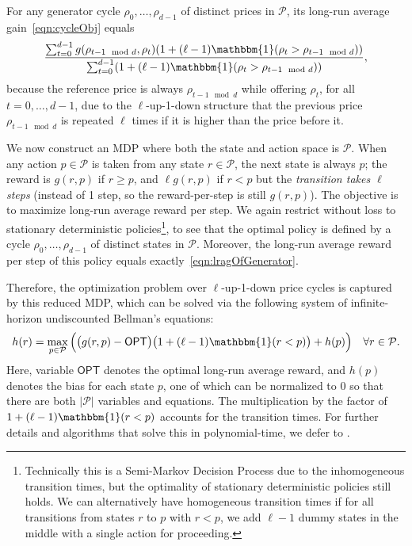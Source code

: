 \documentclass[format=acmsmall, review=false]{acmart}
\newcommand{\OPT}{\mathsf{OPT}}
\newcommand{\bI}{\mathbbm{1}}
\newcommand{\cP}{\mathcal{P}}
\newcommand{\luid}{$\ell$-up-1-down\xspace}
\begin{document}
For any generator cycle $\rho_0,\ldots,\rho_{d-1}$ of distinct prices in $\cP$, its long-run average gain~\eqref{eqn:cycleObj} equals
\begin{align} \label{eqn:lragOfGenerator}
\frac{\sum_{t=0}^{d-1}g(\rho_{t-1\mod d},\rho_t)(1+(\ell-1)\bI(\rho_t>\rho_{t-1\mod d}))}{\sum_{t=0}^{d-1}(1+(\ell-1)\bI(\rho_t>\rho_{t-1\mod d}))},
\end{align}
because the reference price is always $\rho_{t-1\mod d}$ while offering $\rho_t$, for all $t=0,\ldots,d-1$, due to the \luid structure that the previous price $\rho_{t-1\mod d}$ is repeated $\ell$ times if it is higher than the price before it.

We now construct an MDP where both the state and action space is $\cP$.  When any action $p\in\cP$ is taken from any state $r\in\cP$, the next state is always $p$;  the reward is $g(r,p)$ if $r\ge p$, and $\ell g(r,p)$ if $r<p$ but the \textit{transition takes $\ell$ steps} (instead of 1 step, so the reward-per-step is still $g(r,p)$).
The objective is to maximize long-run average reward per step.
We again restrict without loss to stationary deterministic policies\footnote{Technically this is a Semi-Markov Decision Process due to the inhomogeneous transition times, but the optimality of stationary deterministic policies still holds.  We can alternatively have homogeneous transition times if for all transitions from states $r$ to $p$ with $r<p$, we add $\ell-1$ dummy states in the middle with a single action for proceeding.}, to see that the optimal policy is defined by a cycle $\rho_0,\ldots,\rho_{d-1}$ of distinct states in $\cP$.
Moreover, the long-run average reward per step of this policy equals exactly~\eqref{eqn:lragOfGenerator}.

Therefore, the optimization problem over \luid price cycles is captured by this reduced MDP, which can be solved via the following system of infinite-horizon undiscounted Bellman's equations:
\begin{align} \label{eqn:bellman}
h(r) &=\max_{p\in\cP}\Big(\big(g(r,p)-\OPT\big)\big(1+(\ell-1)\bI(r<p)\big)+h(p)\Big) &\forall r\in\cP.
\end{align}
Here, variable $\OPT$ denotes the optimal long-run average reward, and $h(p)$ denotes the bias for each state $p$, one of which can be normalized to 0 so that there are both $|\cP|$ variables and equations.  The multiplication by the factor of $1+(\ell-1)\bI(r<p)$ accounts for the transition times.  For further details and algorithms that solve this in polynomial-time, we defer to \citet{puterman2014markov}.
\end{document}
